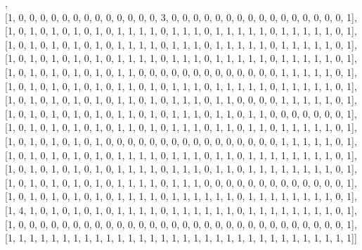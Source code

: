 \documentclass[11pt,a4paper]{report}
\begin{document}
\begin{center}
\begin{small}
					 [1, 0, 1, 1, 0, 1, 0, 1, 0, 1, 0, 1, 1, 1, 0, 1, 1, 1, 0, 1, 1, 1, 1, 1, 0, 1, 1, 1, 1, 1, 0, 1], \\ [0pt] 
					 [1, 0, 0, 0, 0, 0, 0, 0, 0, 0, 0, 0, 0, 0, 3, 0, 0, 0, 0, 0, 0, 0, 0, 0, 0, 0, 0, 0, 0, 0, 0, 1], \\ [0pt] 
					 [1, 0, 1, 0, 1, 0, 1, 0, 1, 0, 1, 1, 1, 1, 0, 1, 1, 1, 0, 1, 1, 1, 1, 1, 0, 1, 1, 1, 1, 1, 0, 1], \\ [0pt] 
					 [1, 0, 1, 0, 1, 0, 1, 0, 1, 0, 1, 1, 1, 1, 0, 1, 1, 1, 0, 1, 1, 1, 1, 1, 0, 1, 1, 1, 1, 1, 0, 1], \\ [0pt] 
					 [1, 0, 1, 0, 1, 0, 1, 0, 1, 0, 1, 1, 1, 1, 0, 1, 1, 1, 0, 1, 1, 1, 1, 1, 0, 1, 1, 1, 1, 1, 0, 1], \\ [0pt] 
					 [1, 0, 1, 0, 1, 0, 1, 0, 1, 0, 1, 1, 0, 0, 0, 0, 0, 0, 0, 0, 0, 0, 0, 0, 0, 1, 1, 1, 1, 1, 0, 1], \\ [0pt] 
					 [1, 0, 1, 0, 1, 0, 1, 0, 1, 0, 1, 1, 0, 1, 0, 1, 1, 1, 0, 1, 1, 1, 1, 1, 0, 1, 1, 1, 1, 1, 0, 1], \\ [0pt] 
					 [1, 0, 1, 0, 1, 0, 1, 0, 1, 0, 1, 1, 0, 1, 0, 1, 1, 1, 0, 1, 1, 0, 0, 0, 0, 1, 1, 1, 1, 1, 0, 1], \\ [0pt] 
					 [1, 0, 1, 0, 1, 0, 1, 0, 1, 0, 1, 1, 0, 1, 0, 1, 1, 1, 0, 1, 1, 0, 1, 1, 0, 0, 0, 0, 0, 0, 0, 1], \\ [0pt] 
					 [1, 0, 1, 0, 1, 0, 1, 0, 1, 0, 1, 1, 0, 1, 0, 1, 1, 1, 0, 1, 1, 0, 1, 1, 0, 1, 1, 1, 1, 1, 0, 1], \\ [0pt] 
					 [1, 0, 1, 0, 1, 0, 1, 0, 1, 0, 0, 0, 0, 0, 0, 0, 0, 0, 0, 0, 0, 0, 0, 0, 0, 1, 1, 1, 1, 1, 0, 1], \\ [0pt] 
					 [1, 0, 1, 0, 1, 0, 1, 0, 1, 0, 1, 1, 1, 1, 0, 1, 1, 1, 0, 1, 1, 0, 1, 1, 1, 1, 1, 1, 1, 1, 0, 1], \\ [0pt] 
					 [1, 0, 1, 0, 1, 0, 1, 0, 1, 0, 1, 1, 1, 1, 0, 1, 1, 1, 0, 1, 1, 0, 1, 1, 1, 1, 1, 1, 1, 1, 0, 1], \\ [0pt] 
					 [1, 0, 1, 0, 1, 0, 1, 0, 1, 0, 1, 1, 1, 1, 0, 1, 1, 1, 0, 0, 0, 0, 0, 0, 0, 0, 0, 0, 0, 0, 0, 1], \\ [0pt] 
					 [1, 0, 1, 0, 1, 0, 1, 0, 1, 0, 1, 1, 1, 1, 0, 1, 1, 1, 1, 1, 1, 0, 1, 1, 1, 1, 1, 1, 1, 1, 0, 1], \\ [0pt] 
					 [1, 4, 1, 0, 1, 0, 1, 0, 1, 0, 1, 1, 1, 1, 0, 1, 1, 1, 1, 1, 1, 0, 1, 1, 1, 1, 1, 1, 1, 1, 0, 1], \\ [0pt] 
					 [1, 0, 0, 0, 0, 0, 0, 0, 0, 0, 0, 0, 0, 0, 0, 0, 0, 0, 0, 0, 0, 0, 0, 0, 0, 0, 0, 0, 0, 0, 0, 1], \\ [0pt] 
					 [1, 1, 1, 1, 1, 1, 1, 1, 1, 1, 1, 1, 1, 1, 1, 1, 1, 1, 1, 1, 1, 1, 1, 1, 1, 1, 1, 1, 1, 1, 1, 1]] \\ [0pt] 
				\end{small}
				\end{center}
\end{document}
